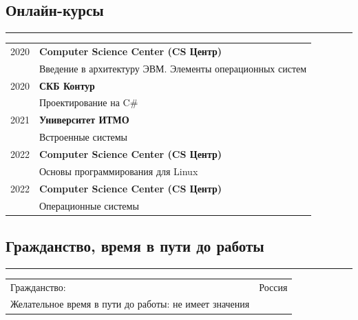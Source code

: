 \documentclass[10pt, final, twoside]{article}
\begin{document}
  \subsection*{\textcolor{darkgray2}{Онлайн-курсы}}
  \vspace*{-5.5mm}
  \par\noindent\rule{\textwidth}{0.1pt}
  \begin{table}[H]
    \begin{tabular}{ll}
      2020 & \textbf{Computer Science Center (CS Центр)}\\
           & Введение в архитектуру ЭВМ. Элементы операционных систем\\\hline
      2020 & \textbf{СКБ Контур}\\
           & Проектирование на C\#\\\hline
      2021 & \textbf{Университет ИТМО}\\
           & Встроенные системы\\\hline
      2022 & \textbf{Computer Science Center (CS Центр)}\\
           & Основы программирования для Linux\\\hline
      2022 & \textbf{Computer Science Center (CS Центр)}\\
           & Операционные системы\\\hline
    \end{tabular}
  \end{table}

  \subsection*{\textcolor{darkgray2}{Гражданство, время в пути до работы}}
  \vspace*{-5.5mm}
  \par\noindent\rule{\textwidth}{0.1pt}
  \begin{table}[H]
    \begin{tabular}{ll}
      Гражданство: & Россия\\
      Желательное время в пути до работы: не имеет значения
    \end{tabular}
  \end{table}
\end{document}

